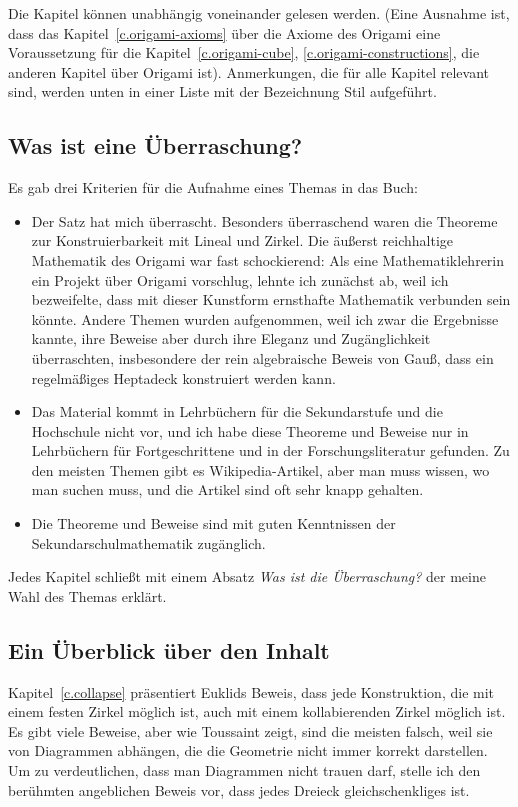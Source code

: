  Die Kapitel können unabhängig voneinander gelesen werden. (Eine Ausnahme ist, dass das Kapitel~\ref{c.origami-axioms} über die Axiome des Origami eine Voraussetzung für die Kapitel~\ref{c.origami-cube}, \ref{c.origami-constructions}, die anderen Kapitel über Origami ist). Anmerkungen, die für alle Kapitel relevant sind, werden unten in einer Liste mit der Bezeichnung Stil aufgeführt.

\subsection*{Was ist eine Überraschung?}

Es gab drei Kriterien für die Aufnahme eines Themas in das Buch:
\begin{itemize}
\item Der Satz hat mich überrascht. Besonders überraschend waren die Theoreme zur Konstruierbarkeit mit Lineal und Zirkel. Die äußerst reichhaltige Mathematik des Origami war fast schockierend: Als eine Mathematiklehrerin ein Projekt über Origami vorschlug, lehnte ich zunächst ab, weil ich bezweifelte, dass mit dieser Kunstform ernsthafte Mathematik verbunden sein könnte.
Andere Themen wurden aufgenommen, weil ich zwar die Ergebnisse kannte, ihre Beweise aber durch ihre Eleganz und Zugänglichkeit überraschten, insbesondere der rein algebraische Beweis von Gauß, dass ein regelmäßiges Heptadeck konstruiert werden kann.

\item Das Material kommt in Lehrbüchern für die Sekundarstufe und die Hochschule nicht vor, und ich habe diese Theoreme und Beweise nur in Lehrbüchern für Fortgeschrittene und in der Forschungsliteratur gefunden. Zu den meisten Themen gibt es Wikipedia-Artikel, aber man muss wissen, wo man suchen muss, und die Artikel sind oft sehr knapp gehalten.

\item Die Theoreme und Beweise sind mit guten Kenntnissen der Sekundarschulmathematik zugänglich.
\end{itemize}
Jedes Kapitel schließt mit einem Absatz \textit{Was ist die Überraschung?} der meine Wahl des Themas erklärt.

\subsection*{Ein Überblick über den Inhalt}

Kapitel~\ref{c.collapse} präsentiert Euklids Beweis, dass jede Konstruktion, die mit einem festen Zirkel möglich ist, auch mit einem kollabierenden Zirkel möglich ist. Es gibt viele Beweise, aber wie Toussaint zeigt, sind die meisten falsch, weil sie von Diagrammen abhängen, die die Geometrie nicht immer korrekt darstellen. Um zu verdeutlichen, dass man Diagrammen nicht trauen darf, stelle ich den berühmten angeblichen Beweis vor, dass jedes Dreieck gleichschenkliges ist. 

